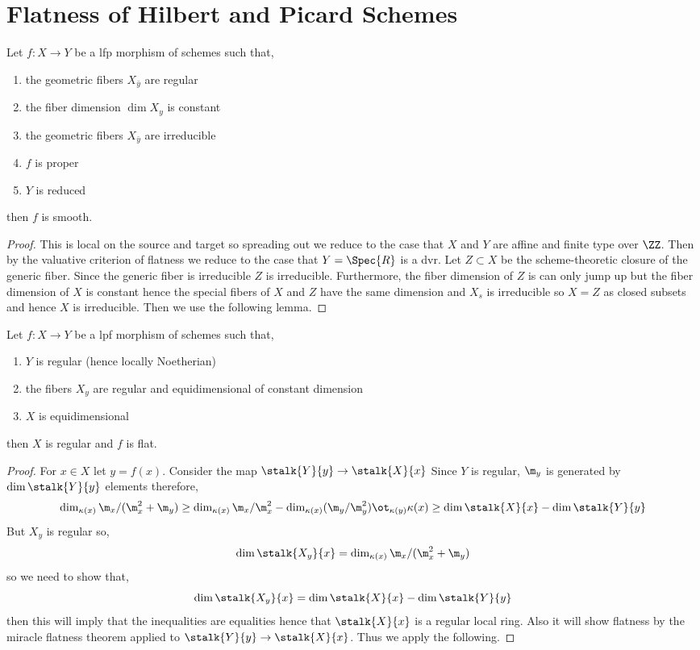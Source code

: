 \documentclass[12pt]{article}
\begin{document}
\section{Flatness of Hilbert and Picard Schemes}

\begin{prop}
Let $f : X \to Y$ be a lfp morphism of schemes such that,
\begin{enumerate}
\item the geometric fibers $X_{\bar{y}}$ are regular
\item the fiber dimension $\dim{X_y}$ is constant
\item the geometric fibers $X_{\bar{y}}$ are irreducible
\item $f$ is proper
\item $Y$ is reduced
\end{enumerate}
then $f$ is smooth.
\end{prop}

\begin{proof}
This is local on the source and target so spreading out we reduce to the case that $X$ and $Y$ are affine and finite type over $\ZZ$. Then by the valuative criterion of flatness we reduce to the case that $Y = \Spec{R}$ is a dvr. Let $Z \subset X$ be the scheme-theoretic closure of the generic fiber. Since the generic fiber is irreducible $Z$ is irreducible. Furthermore, the fiber dimension of $Z$ is can only jump up but the fiber dimension of $X$ is constant hence the special fibers of $X$ and $Z$ have the same dimension and $X_s$ is irreducible so $X = Z$ as closed subsets and hence $X$ is irreducible. Then we use the following lemma.
\end{proof}

\begin{lemma}
Let $f : X \to Y$ be a lpf morphism of schemes such that,
\begin{enumerate}
\item $Y$ is regular (hence locally Noetherian)
\item the fibers $X_y$ are regular and equidimensional of constant dimension
\item $X$ is equidimensional
\end{enumerate}
then $X$ is regular and $f$ is flat.
\end{lemma}

\begin{proof}
For $x \in X$ let $y = f(x)$. Consider the map $\stalk{Y}{y} \to \stalk{X}{x}$
Since $Y$ is regular, $\m_y$ is generated by $\dim{\stalk{Y}{y}}$ elements therefore,
\[ \dim_{\kappa(x)} \m_x / (\m_x^2 + \m_y) \ge \dim_{\kappa(x)} \m_x / \m_x^2 - \dim_{\kappa(x)} (\m_y / \m_y^2) \ot_{\kappa(y)} \kappa(x) \ge \dim{\stalk{X}{x}} - \dim{\stalk{Y}{y}} \]
But $X_y$ is regular so,
\[ \dim{\stalk{X_y}{x}} = \dim_{\kappa(x)} \m_x / (\m_x^2 + \m_y) \]
so we need to show that,
\[ \dim{\stalk{X_y}{x}} = \dim{\stalk{X}{x}} - \dim{\stalk{Y}{y}} \]
then this will imply that the inequalities are equalities hence that $\stalk{X}{x}$ is a regular local ring. Also it will show flatness by the miracle flatness theorem applied to $\stalk{Y}{y} \to \stalk{X}{x}$. Thus we apply the following.
\end{proof}
\end{document}
